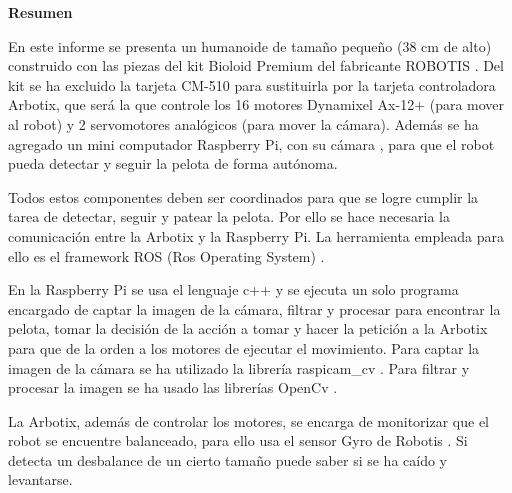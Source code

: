 \setcounter{page}{4}
\begin{center}
	{\bf Resumen}  %
\end{center}	

En este informe se presenta un humanoide de tamaño pequeño (38 cm de alto) construido con las piezas del kit Bioloid Premium \cite{robotics} del fabricante ROBOTIS \cite{robotics1}. Del kit se ha excluido la tarjeta CM-510 para sustituirla por la tarjeta controladora Arbotix, que será la que controle los 16 motores Dynamixel Ax-12+ (para mover al robot) y 2 servomotores analógicos (para mover la cámara). Además se ha agregado un mini computador Raspberry Pi, con su cámara \cite{raspberrycam}, para que el robot pueda detectar y seguir la pelota de forma autónoma. 

Todos estos componentes deben ser coordinados para que se logre cumplir la tarea de detectar, seguir y patear la pelota. Por ello se hace necesaria la comunicación entre la Arbotix y la Raspberry Pi. La herramienta empleada para ello es el framework ROS (Ros Operating System) \cite{ros}.

En la Raspberry Pi se usa el lenguaje c++ y se ejecuta un solo programa encargado de captar la imagen de la cámara, filtrar y procesar para encontrar la pelota, tomar la decisión de la acción a tomar y hacer la petición a la Arbotix para que de la orden a los motores de ejecutar el movimiento. Para captar la imagen de la cámara se ha utilizado la librería raspicam\_cv \cite{camara}. Para filtrar y procesar la imagen se ha usado las librerías OpenCv \cite{opencv}. 

La Arbotix, además de controlar los motores, se encarga de monitorizar que el robot se encuentre balanceado, para ello usa el sensor Gyro de Robotis \cite{gyro}. Si detecta un desbalance de un cierto tamaño puede saber si se ha caído y levantarse. 